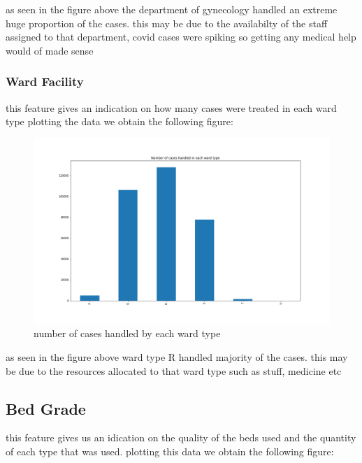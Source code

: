 \documentclass[fleqn]{article}
\begin{document}
			as seen in the figure above the department of gynecology handled an 					extreme huge proportion of the cases. this may be due to the availabilty 			of the staff assigned to that department, covid cases were spiking so 					getting any medical help would of made sense
			
			
		\subsubsection*{Ward Facility}
		 this feature gives an indication on how many cases were treated in each 				ward type plotting the data we obtain the following figure:
		 
		 \begin{figure}[hb]
  				\includegraphics[width=\linewidth]{ward_hist.png}
  				\caption{number of cases handled by each ward type}
  				\label{fig:6}
			\end{figure} 
			\FloatBarrier
			
		as seen in the figure above ward type R handled majority of the cases. this 			may be due to the resources allocated to that ward type such as stuff, 					medicine etc
		
		\subsection*{Bed Grade}
			this feature gives us an idication on the quality of the beds used and 					the quantity of each type that was used. plotting this data we obtain 					the following figure:	
			
\end{document}
